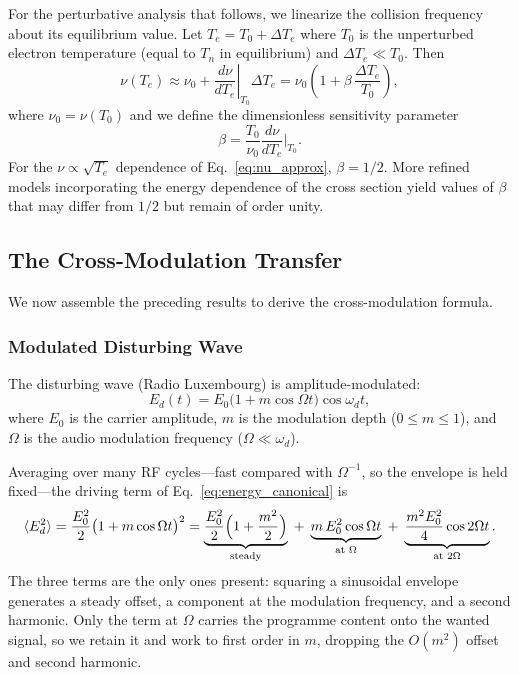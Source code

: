 \documentclass[12pt]{article}
\begin{document}
For the perturbative analysis that follows, we linearize the collision frequency about its
equilibrium value.  Let $T_e = T_0 + \Delta T_e$ where $T_0$ is the unperturbed electron
temperature (equal to $T_n$ in equilibrium) and $\Delta T_e \ll T_0$.  Then
\begin{equation}
  \nu(T_e) \approx \nu_0 + \left.\frac{d\nu}{dT_e}\right|_{T_0}\!\!\Delta T_e
           = \nu_0\!\left(1 + \beta\,\frac{\Delta T_e}{T_0}\right),
  \label{eq:nu_linear}
\end{equation}
where $\nu_0 = \nu(T_0)$ and we define the dimensionless sensitivity parameter
\begin{equation}
  \beta = \frac{T_0}{\nu_0}\frac{d\nu}{dT_e}\bigg|_{T_0}.
  \label{eq:beta}
\end{equation}
For the $\nu \propto \sqrt{T_e}$ dependence of Eq.~\eqref{eq:nu_approx}, $\beta = 1/2$.
More refined models incorporating the energy dependence of the cross section yield values
of $\beta$ that may differ from $1/2$ but remain of order unity.

\subsection{The Cross-Modulation Transfer}
\label{sec:crossmod}

We now assemble the preceding results to derive the cross-modulation formula.

\subsubsection{Modulated Disturbing Wave}

The disturbing wave (Radio Luxembourg) is amplitude-modulated:
\begin{equation}
  E_d(t) = E_0\bigl(1 + m\cos\Omega t\bigr)\cos\omega_d t,
  \label{eq:AM}
\end{equation}
where $E_0$ is the carrier amplitude, $m$ is the modulation depth ($0 \le m \le 1$), and
$\Omega$ is the audio modulation frequency ($\Omega \ll \omega_d$).

Averaging over many RF cycles---fast compared with $\Omega^{-1}$, so the envelope is
held fixed---the driving term of Eq.~\eqref{eq:energy_canonical} is
\begin{equation}
  \langle E_d^2 \rangle = \frac{E_0^2}{2}\bigl(1 + m\cos\Omega t\bigr)^2
    = \underbrace{\frac{E_0^2}{2}\Bigl(1 + \frac{m^2}{2}\Bigr)}_{\text{steady}}
    \;+\; \underbrace{m\,E_0^2\cos\Omega t}_{\text{at }\Omega}
    \;+\; \underbrace{\frac{m^2E_0^2}{4}\cos 2\Omega t}_{\text{at }2\Omega}.
  \label{eq:power_env}
\end{equation}
The three terms are the only ones present: squaring a sinusoidal envelope generates a
steady offset, a component at the modulation frequency, and a second harmonic.  Only the
term at $\Omega$ carries the programme content onto the wanted signal, so we retain it and
work to first order in $m$, dropping the $O(m^2)$ offset and second harmonic.
\end{document}
